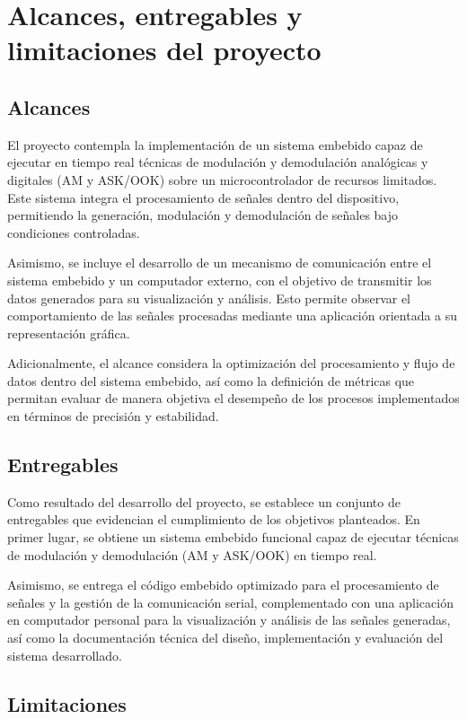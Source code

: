 \section{Alcances, entregables y limitaciones del proyecto}

\subsection{Alcances}

El proyecto contempla la implementación de un sistema embebido capaz de ejecutar en tiempo real técnicas de modulación y demodulación analógicas y digitales (AM y ASK/OOK) sobre un microcontrolador de recursos limitados. Este sistema integra el procesamiento de señales dentro del dispositivo, permitiendo la generación, modulación y demodulación de señales bajo condiciones controladas.

Asimismo, se incluye el desarrollo de un mecanismo de comunicación entre el sistema embebido y un computador externo, con el objetivo de transmitir los datos generados para su visualización y análisis. Esto permite observar el comportamiento de las señales procesadas mediante una aplicación orientada a su representación gráfica.

Adicionalmente, el alcance considera la optimización del procesamiento y flujo de datos dentro del sistema embebido, así como la definición de métricas que permitan evaluar de manera objetiva el desempeño de los procesos implementados en términos de precisión y estabilidad.

\subsection{Entregables}

Como resultado del desarrollo del proyecto, se establece un conjunto de entregables que evidencian el cumplimiento de los objetivos planteados. En primer lugar, se obtiene un sistema embebido funcional capaz de ejecutar técnicas de modulación y demodulación (AM y ASK/OOK) en tiempo real.

Asimismo, se entrega el código embebido optimizado para el procesamiento de señales y la gestión de la comunicación serial, complementado con una aplicación en computador personal para la visualización y análisis de las señales generadas, así como la documentación técnica del diseño, implementación y evaluación del sistema desarrollado.

\subsection{Limitaciones}

